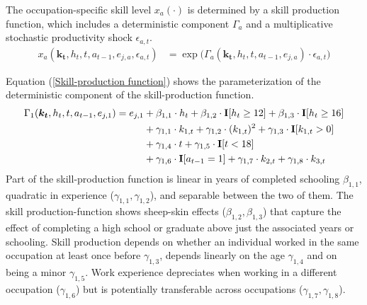 \noindent The occupation-specific skill level $x_{a}(\cdot)$ is determined by a skill production function, which includes a deterministic component $\Gamma_a$ and a multiplicative stochastic productivity shock $\epsilon_{a,t}$.
%
\begin{align}
    x_{a}(\bm{k_t}, h_t, t, a_{t-1}, e_{j, a}, \epsilon_{a,t}) & = \exp \big( \Gamma_{a}(\bm{k_t},  h_t, t, a_{t-1}, e_{j,a}) \cdot \epsilon_{a,t} \big) \nonumber
\end{align}

\noindent Equation (\ref{Skill-production function}) shows the parameterization of the deterministic component of the skill-production function.
%
\begin{align}\label{Skill-production function}
    \Gamma_1(\bm{k_t}, h_t, t, a_{t-1}, e_{j, 1}) = e_{j,1} & + \beta_{1,1} \cdot h_t + \beta_{1, 2} \cdot {\textbf{I}}[h_t \geq 12] + \beta_{1,3} \cdot {\textbf{I}}[h_t\geq 16]\\ \nonumber
                                  & + \gamma_{1, 1} \cdot  k_{1,t} + \gamma_{1,2} \cdot  (k_{1,t})^2 + \gamma_{1,3} \cdot  {\textbf{I}}[k_{1,t} > 0] \\ \nonumber
                                & + \gamma_{1,4} \cdot  t + \gamma_{1,5} \cdot {\textbf{I}}[t < 18]\\ \nonumber
                                  & + \gamma_{1,6} \cdot {\textbf{I}}[a_{t-1} = 1] + \gamma_{1,7} \cdot  k_{2,t} + \gamma_{1,8} \cdot  k_{3,t} \nonumber
\end{align}
%
\noindent Part of the skill-production function is linear in years of completed schooling $\beta_{1,1}$, quadratic in experience ($\gamma_{1,1}, \gamma_{1,2}$), and separable between the two of them. The skill production-function shows sheep-skin effects ($\beta_{1,2}, \beta_{1,3}$) that capture the effect of completing a high school or graduate above just the associated years or schooling. Skill production depends on whether an individual worked in the same occupation at least once before $\gamma_{1,3}$, depends linearly on the age $\gamma_{1,4}$ and on being a minor $\gamma_{1,5}$. Work experience depreciates when working in a different occupation ($\gamma_{1,6}$) but is potentially transferable across occupations ($\gamma_{1,7}, \gamma_{1,8}$). \\

